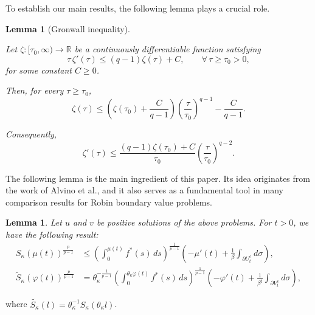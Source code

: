 \documentclass[11pt]{article}
\newtheorem{lemma}[theorem]{Lemma}
\numberwithin{equation}{section}
\theoremstyle{definition}
\theoremstyle{remark}
\begin{document}
To establish our main results, the following lemma plays a crucial role.
\begin{lemma}[Gronwall inequality]
\label{lem:3.1}

Let $\zeta:[\tau_0,\infty)\to\mathbb{R}$ be a continuously differentiable function satisfying
\[
\tau\,\zeta'(\tau)
\le
(q-1)\zeta(\tau)+C,
\qquad
\forall\,\tau\ge\tau_0>0,
\]
for some constant $C\ge0$.

Then, for every $\tau\ge\tau_0$,
\[
\zeta(\tau)
\le
\left(
\zeta(\tau_0)+\frac{C}{q-1}
\right)
\left(
\frac{\tau}{\tau_0}
\right)^{q-1}
-\frac{C}{q-1}.
\]

Consequently,
\[
\zeta'(\tau)
\le
\frac{(q-1)\zeta(\tau_0)+C}{\tau_0}
\left(
\frac{\tau}{\tau_0}
\right)^{q-2}.
\]
\end{lemma}
The following lemma is the main ingredient of this paper. Its idea originates from the work of Alvino et al.\cite{alvino2023talenti}, 
and it also serves as a fundamental tool in many comparison results for Robin boundary value problems.
\begin{lemma}
  Let $u$ and $v$ be positive solutions of the above problems. For $t>0$, we have the following result:
\begin{align}
S_\kappa(\mu(t))^{\frac{p}{p-1}}
&\le
\left(\int_0^{\mu(t)} f^*(s)\,ds\right)^\frac{1}{p-1}
\left(-\mu'(t)+\frac{1}{\beta}\int_{\partial U_t^e} d\sigma\right),
\label{eq:3.1}
\\
\tilde S_\kappa(\varphi(t))^\frac{p}{p-1}
&=
\theta_\kappa^{-\frac{1}{p-1}}
\left(\int_0^{\theta_\kappa \varphi(t)} f^*(s)\,ds\right)^{\frac{1}{p-1}}
\left(-\varphi'(t)+\frac{1}{\beta^\sharp}\int_{\partial V_t^e} d\sigma\right),
\label{eq:3.2}
\end{align}
\end{lemma}
where $\tilde{S_\kappa}(l) = \theta_\kappa^{-1}S_\kappa(\theta_\kappa l)$.
\end{document}
